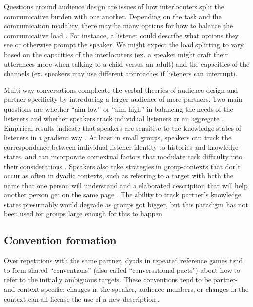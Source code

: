 \documentclass[]{article}
\begin{document}
Questions around audience design are %
issues of how interlocuters split the communicative burden with one another. Depending on the task and the communication modality, there may be many options for how to balance the communicative load  \citep{clark1996, fay2010, foxtree2013}. For instance, a listener could describe what options they see or otherwise prompt the speaker. We might expect the load splitting to vary based on the capacities of the interlocuters (ex. a speaker might craft their utterances more when talking to a child versus an adult) and the capacities of the channels (ex. speakers may use different approaches if listeners can interrupt). 


Multi-way conversations complicate the verbal theories of audience design and partner specificity by introducing a larger audience of more partners. Two main questions are whether ``aim low'' or ``aim high'' in balancing the needs of the listeners and whether speakers track individual listeners or an aggregate \cite{yoon2014}. Empirical results indicate that speakers are sensitive to the knowledge states of listeners in a gradient way \citep{yoon2014, yoon2018, yoon2019}. At least in small groups, speakers can track the correspondence between individual listener identity to histories and knowledge states, and can incorporate contextual factors that modulate task difficulty into their considerations \citep{yoon2019a}. Speakers also take strategies in group-contexts that don't occur as often in dyadic contexts, such as referring to a target with both the name that one person will understand and a elaborated description that will help another person get on the same page \citep{yoon2018}. The ability to track partner's knowledge states presumably would degrade as groups got bigger, but this paradigm has not been used for groups large enough for this to happen. 

\subsection{Convention formation}
Over repetitions with the same partner, dyads in repeated reference games tend to form shared ``conventions'' (also called ``conversational pacts'') about how to refer to the initially ambiguous targets. These conventions tend to be partner- and context-specific: changes in the speaker, audience members, or changes in the context can all license the use of a new description \citep{metzing2003a, ibarra2016, yoon2014}.
\end{document}
